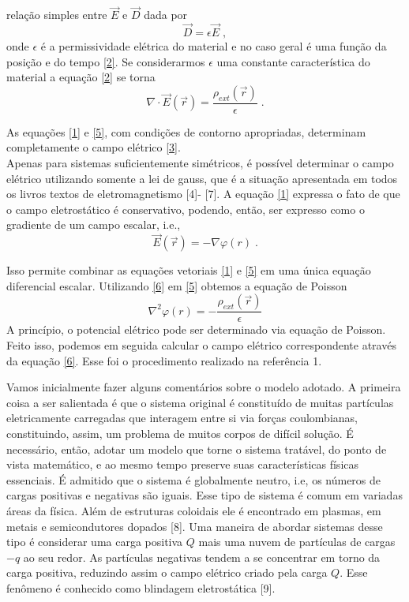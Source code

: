 \documentclass[brazilian,10.7pt,a4paper]{article}
\begin{document}
\begin{multicols}{2}
relação simples entre $\vec{E}$ e $\vec{D}$ dada por
\\
\begin{equation}\label{4}
\vec{D} = \epsilon\vec{E}\;,
\end{equation}
onde $\epsilon$ é a permissividade elétrica do material e no caso geral é uma função da posição e do tempo \ref{2}. Se considerarmos $\epsilon$ uma constante característica do material a equação \eqref{2} se torna
\\
\begin{equation}\label{5}
\nabla\cdot\vec{E}(\vec{r})=\frac{\rho_{ext}(\vec{r})}{\epsilon}\;.
\end{equation}
\par As equações \eqref{1} e \eqref{5}, com condições de contorno apropriadas, determinam completamente o campo elétrico \ref{3}.\\
Apenas para sistemas suficientemente simétricos, é possível determinar o campo elétrico utilizando somente a lei de gauss, que é a situação apresentada em todos os livros textos de eletromagnetismo [4]- [7]. A equação \eqref{1} expressa o fato de que o campo eletrostático é conservativo, podendo, então, ser expresso como o gradiente de um campo escalar, i.e., %
\\
\begin{equation}\label{6}
\vec{E}(\vec{r})= -\nabla\varphi(r)\;.
\end{equation}
\par Isso permite combinar as equações vetoriais \eqref{1} e \eqref{5} em uma única equação diferencial escalar. Utilizando \eqref{6} em \eqref{5} obtemos a equação de Poisson
\\
\begin{equation}\label{7}
\nabla^{2}\varphi(r)=-\frac{\rho_{ext}(\vec{r})}{\epsilon}
\end{equation}
A princípio, o potencial elétrico pode ser determinado via equação de Poisson. Feito isso, podemos em seguida calcular o campo elétrico correspondente através da equação \eqref{6}. Esse foi o procedimento realizado na referência 1.
\par Vamos inicialmente fazer alguns comentários sobre o modelo adotado. A primeira coisa a ser salientada é que o sistema original é constituído de muitas partículas eletricamente carregadas que interagem entre si via forças coulombianas, constituindo, assim, um problema de muitos corpos de difícil solução. É necessário, então, adotar um modelo que torne o sistema tratável, do ponto de vista matemático, e ao mesmo tempo preserve suas características físicas essenciais. É admitido que o sistema é globalmente neutro, i.e, os números de cargas positivas e negativas são iguais. Esse tipo de sistema é comum em variadas áreas da física. Além de estruturas coloidais ele é encontrado em plasmas, em metais e semicondutores dopados [8]. Uma maneira de abordar sistemas desse tipo é considerar uma carga positiva $Q$ mais uma nuvem de partículas de cargas $-q$ ao seu redor. As partículas negativas tendem a se concentrar em torno da carga positiva, reduzindo assim o campo elétrico criado pela carga $Q$. Esse fenômeno é conhecido como blindagem eletrostática [9].

\end{multicols}
\end{document}
